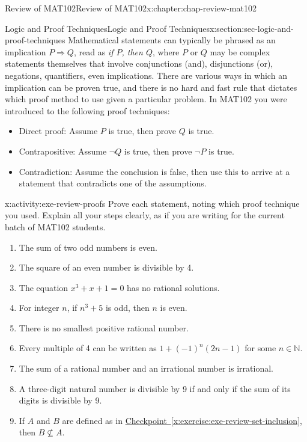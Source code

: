 \documentclass[oneside,10pt,]{book}
\newcommand{\xreffont}{\relax}
\numberwithin{equation}{section}
\begin{document}
\begin{chapterptx}{Review of MAT102}{}{Review of MAT102}{}{}{x:chapter:chap-review-mat102}
\typeout{************************************************}
%
\begin{sectionptx}{Logic and Proof Techniques}{}{Logic and Proof Techniques}{}{}{x:section:sec-logic-and-proof-techniques}
Mathematical statements can typically be phrased as an implication \(P \Rightarrow Q\),  read as \emph{if \(P\), then \(Q\)}, where \(P\) or \(Q\) may be complex statements themselves that involve conjunctions (and), disjunctions (or), negations, quantifiers, even implications. There are various ways in which an implication can be proven true, and there is no hard and fast rule that dictates which proof method to use given a particular problem. In MAT102 you were introduced to the following proof techniques:%
\par
%
\begin{itemize}[label=\textbullet]
\item{}Direct proof: Assume \(P\) is true, then prove \(Q\) is true.%
\item{}Contrapositive: Assume \(\neg Q\) is true, then prove \(\neg P\) is true.%
\item{}Contradiction: Assume the conclusion is false, then use this to arrive at a statement that contradicts one of the assumptions.%
\end{itemize}
%
\begin{activity}{}{x:activity:exe-review-proofs}%
Prove each statement, noting which proof technique you used. Explain all your steps clearly, as if you are writing for the current batch of MAT102 students.%
\begin{enumerate}[label=(\alph*)]
\item{}The sum of two odd numbers is even.%
\item{}The square of an even number is divisible by 4.%
\item{}The equation \(x^3 + x + 1 = 0\) has no rational solutions.%
\item{}For integer \(n\), if \(n^3 + 5\) is odd, then \(n\) is even.%
\item{}There is no smallest positive rational number.%
\item{}Every multiple of 4 can be written as \(1 + (-1)^n(2n-1)\) for some \(n \in \mathbb{N}\).%
\item{}The sum of a rational number and an irrational number is irrational.%
\item{}A three-digit natural number is divisible by 9 if and only if the sum of its digits is divisible by 9.%
\item{}If \(A\) and \(B\) are defined as in \hyperref[x:exercise:exe-review-set-inclusion]{Checkpoint~{\xreffont\ref{x:exercise:exe-review-set-inclusion}}}, then \(B \not\subseteq A\).%

\end{enumerate}
\end{activity}
\end{sectionptx}
\end{chapterptx}
\end{document}
